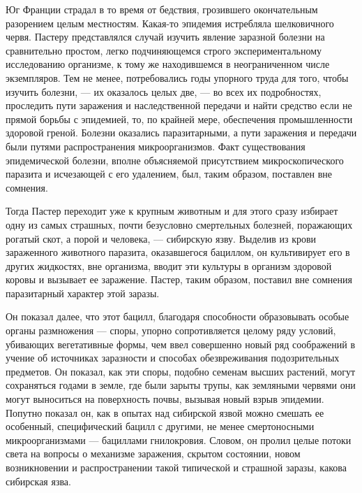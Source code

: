 Юг Франции  страдал в то  время от бедствия,  грозившего окончательным
разорением целым местностям. Какая-то эпидемия истребляла шелковичного
червя. Пастеру  представлялся случай изучить явление  заразной болезни
на сравнительно простом, легко подчиняющемся строго экспериментальному
исследованию организме, к тому  же находившемся в неограниченном числе
экземпляров. Тем не менее, потребовались годы упорного труда для того,
чтобы изучить  болезни, ---  их оказалось  целых две,  --- во  всех их
подробностях, проследить  пути заражения  и наследственной  передачи и
найти  средство если  не прямой  борьбы  с эпидемией,  то, по  крайней
мере,  обеспечения промышленности  здоровой греной.  Болезни оказались
паразитарными, а пути заражения и передачи были путями распространения
микроорганизмов.  Факт  существования  эпидемической  болезни,  вполне
объясняемой присутствием микроскопического паразита и исчезающей с его
удалением, был, таким образом, поставлен вне сомнения.

Тогда  Пастер переходит  уже  к  крупным животным  и  для этого  сразу
избирает  одну   из  самых  страшных,  почти   безусловно  смертельных
болезней, поражающих рогатый  скот, а порой и  человека, --- сибирскую
язву. Выделив  из крови  зараженного животного  паразита, оказавшегося
бациллом,  он  культивирует его  в  других  жидкостях, вне  организма,
вводит  эти  культуры  в  организм   здоровой  коровы  и  вызывает  ее
заражение. Пастер,  таким образом, поставил вне  сомнения паразитарный
характер этой заразы.

Он показал далее, что  этот бацилл, благодаря способности образовывать
особые  органы размножения  ---  споры,  упорно сопротивляется  целому
ряду  условий,  убивающих  вегетативные  формы,  чем  ввел  совершенно
новый ряд  соображений в  учение об  источниках заразности  и способах
обезвреживания подозрительных  предметов. Он  показал, как  эти споры,
подобно  семенам высших  растений, могут  сохраняться годами  в земле,
где  были зарыты  трупы, как  земляными червями  они могут  выноситься
на   поверхность  почвы,   вызывая  новый   взрыв  эпидемии.   Попутно
показал  он,  как  в  опытах  над сибирской  язвой  можно  смешать  ее
особенный,  специфический бацилл  с  другими,  не менее  смертоносными
микроорганизмами ---  бациллами гнилокровия.  Словом, он  пролил целые
потоки  света на  вопросы  о механизме  заражения, скрытом  состоянии,
новом  возникновении и  распространении  такой  типической и  страшной
заразы, какова сибирская язва.

